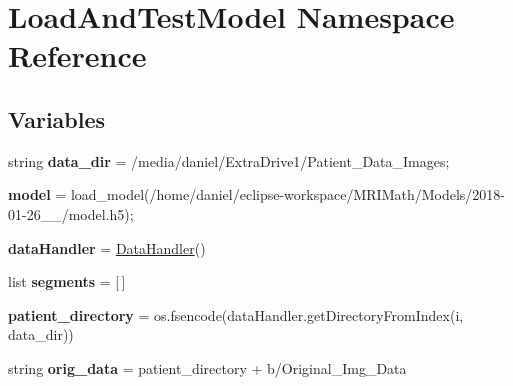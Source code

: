 \hypertarget{namespaceLoadAndTestModel}{}\section{Load\+And\+Test\+Model Namespace Reference}
\label{namespaceLoadAndTestModel}
\subsection*{Variables}
\begin{DoxyCompactItemize}
\item 
\mbox{\label{namespaceLoadAndTestModel_a361241a6702b6faa835ba3b4823f7d35}} 
string {\bfseries data\+\_\+dir} = \textquotesingle{}/media/daniel/Extra\+Drive1/Patient\+\_\+\+Data\+\_\+\+Images\textquotesingle{};
\item 
\mbox{\label{namespaceLoadAndTestModel_a7c95c0ceb71c46e58e3436fc155597fd}} 
{\bfseries model} = load\+\_\+model(\textquotesingle{}/home/daniel/eclipse-\/workspace/M\+R\+I\+Math/Models/2018-\/01-\/26\+\_\+\_/model.\+h5\textquotesingle{});
\item 
\mbox{\label{namespaceLoadAndTestModel_ad819853917b387f9d5a78dad063fdc79}} 
{\bfseries data\+Handler} = \mbox{\hyperlink{classDataHandler_1_1DataHandler}{Data\+Handler}}()
\item 
\mbox{\label{namespaceLoadAndTestModel_a8d9259ecdf95d65b1267a15ebbcee078}} 
list {\bfseries segments} = \mbox{[}$\,$\mbox{]}
\item 
\mbox{\label{namespaceLoadAndTestModel_a0ebe95f90c29b30af71d99b51b4f2440}} 
{\bfseries patient\+\_\+directory} = os.\+fsencode(data\+Handler.\+get\+Directory\+From\+Index(i, data\+\_\+dir))
\item 
\mbox{\label{namespaceLoadAndTestModel_a43a523d3a3deb8b7c6819c3a9e3128d1}} 
string {\bfseries orig\+\_\+data} = patient\+\_\+directory + b\textquotesingle{}/Original\+\_\+\+Img\+\_\+\+Data\textquotesingle{}
\item 
\mbox{\label{namespaceLoadAndTestModel_a5fddddd45be42ad3365a6ef3ffe0426c}} 

\end{DoxyCompactItemize}
